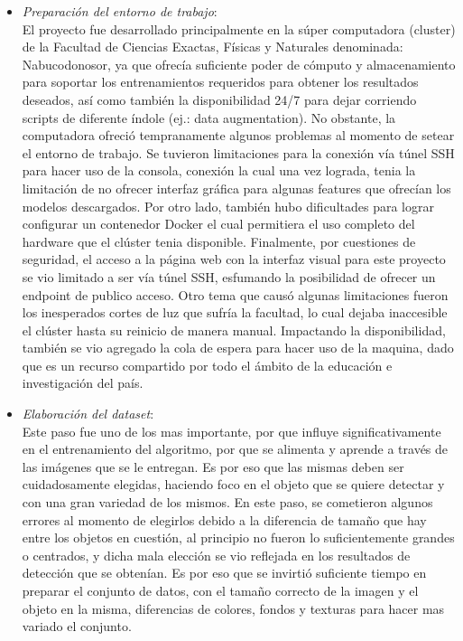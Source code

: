 \begin{itemize}
        \item \textit{Preparación del entorno de trabajo}: \\
            El proyecto fue desarrollado principalmente en la súper computadora (cluster) de la Facultad de Ciencias Exactas, Físicas y Naturales denominada: Nabucodonosor, ya que ofrecía suficiente poder de cómputo y almacenamiento para soportar los entrenamientos requeridos para obtener los resultados deseados, así como también la disponibilidad 24/7 para dejar corriendo scripts de diferente índole (ej.: data augmentation). No obstante, la computadora ofreció tempranamente algunos problemas al momento de setear el entorno de trabajo. Se tuvieron limitaciones para la conexión vía túnel SSH para hacer uso de la consola, conexión la cual una vez lograda, tenia la limitación de no ofrecer interfaz gráfica para algunas features que ofrecían los modelos descargados.
            Por otro lado, también hubo dificultades para lograr configurar un contenedor Docker el cual permitiera el uso completo del hardware que el clúster tenia disponible. Finalmente, por cuestiones de seguridad, el acceso a la página web con la interfaz visual para este proyecto se vio limitado a ser vía túnel SSH, esfumando la posibilidad de ofrecer un endpoint de publico acceso.
            Otro tema que causó algunas limitaciones fueron los inesperados cortes de luz que sufría la facultad, lo cual dejaba inaccesible el clúster hasta su reinicio de manera manual. Impactando la disponibilidad, también se vio agregado la cola de espera para hacer uso de la maquina, dado que es un recurso compartido por todo el ámbito de la educación e investigación del país. \\
        
        \item \textit{Elaboración del dataset}: \\
            Este paso fue uno de los mas importante, por que influye significativamente en el entrenamiento del algoritmo, por que se alimenta y aprende a través de las imágenes que se le entregan. Es por eso que las mismas deben ser cuidadosamente elegidas, haciendo foco en el objeto que se quiere detectar y con una gran variedad de los mismos. En este paso, se cometieron algunos errores al momento de elegirlos debido a la diferencia de tamaño que hay entre los objetos en cuestión, al principio no fueron lo suficientemente grandes o centrados, y dicha mala elección se vio reflejada en los resultados de detección que se obtenían. Es por eso que se invirtió suficiente tiempo en preparar el conjunto de datos, con el tamaño correcto de la imagen y el objeto en la misma, diferencias de colores, fondos y texturas para hacer mas variado el conjunto. \\
            

\end{itemize}
